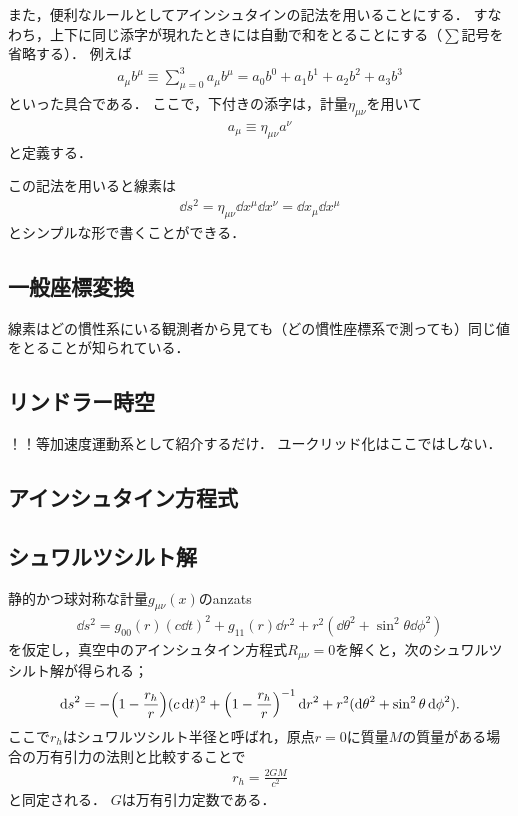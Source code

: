\documentclass[uplatex,dvipdfmx]{vkaishi}
\begin{document}
また，便利なルールとしてアインシュタインの記法を用いることにする．
すなわち，上下に同じ添字が現れたときには自動で和をとることにする（$\sum$記号を省略する）．
例えば
\begin{align}
  a_\mu b^\mu
  \equiv \sum_{\mu=0}^3 a_\mu b^\mu
  = a_0 b^0 + a_1 b^1 + a_2 b^2 + a_3 b^3
\end{align}
といった具合である．
ここで，下付きの添字は，計量$\eta_{\mu\nu}$を用いて
\begin{align}
  a_\mu \equiv \eta_{\mu\nu} a^\nu
\end{align}
と定義する．

この記法を用いると線素は
\begin{align}
  \dd{s}^2
  = \eta_{\mu\nu} \dd{x}^\mu \dd{x}^\nu
  = \dd{x}_\mu \dd{x}^\mu
\end{align}
とシンプルな形で書くことができる．


\subsection{一般座標変換}

線素はどの慣性系にいる観測者から見ても（どの慣性座標系で測っても）同じ値をとることが知られている．



\subsection{リンドラー時空}
！！等加速度運動系として紹介するだけ．
ユークリッド化はここではしない．


\subsection{アインシュタイン方程式}



\subsection{シュワルツシルト解}

静的かつ球対称な計量$g_{\mu\nu}(x)$のanzats
\begin{align*}
  \dd{s}^2 = g_{00}(r) (c\dd{t})^2 + g_{11}(r) \dd{r}^2 + r^2 (\dd{\theta}^2 + \sin^2\theta \dd{\phi}^2)
\end{align*}
を仮定し，真空中のアインシュタイン方程式$R_{\mu\nu} = 0$を解くと，次のシュワルツシルト解が得られる；
\begin{align}
  \dd{s}^2 = - \qty(1 - \frac{r_h}{r}) (c\dd{t})^2 + \qty(1 - \frac{r_h}{r})^{-1} \dd{r}^2 + r^2 (\dd{\theta}^2 + \sin^2\theta \dd{\phi}^2).
  \label{eq:Schwarzschild}
\end{align}
ここで$r_h$はシュワルツシルト半径と呼ばれ，原点$r=0$に質量$M$の質量がある場合の万有引力の法則と比較することで
\begin{align}
  r_h = \frac{2GM}{c^2}
\end{align}
と同定される．
$G$は万有引力定数である．
\end{document}
